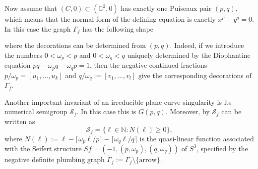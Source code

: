 \documentclass[oneside]{amsart}
\numberwithin{equation}{section}
\numberwithin{equation}{subsection}
\theoremstyle{plain}
\theoremstyle{definition}
\def\C{\mathbb C}
\newcommand{\w}{\omega}
\newcommand{\Se}{\mathcal{S}}
\begin{document}
Now assume that $(C,0)\subset(\C^2,0)$ has exactly one Puiseaux pair $(p,q)$, which means that the normal form of the defining equation is exactly 
$x^p+y^q=0$. In this case the graph $\Gamma_f$ has the following shape 
\begin{figure}[h!]
 \begin{center}
    \end{center}
\end{figure}
where the decorations can be determined from $(p,q)$. Indeed,  
if we introduce the numbers $0<\w_p<p$ and $0<\w_q<q$ uniquely
determined by  the Diophantine equation $pq-\w_p q-\w_q p=1$,  then the  negative continued 
fractions $p/\w_p=[u_1,\dots,u_k]$ and $q/\w_q:=[v_1,\dots,v_l]$ give
the corresponding decorations of $\Gamma_f$. 

Another important invariant of an irreducible plane curve singularity is its
numerical semigroup $\Se_f$. In this case this is $G(p,q)$. Moreover, by \cite{LSz_module} $\Se_f$ can be written as
\begin{equation}
    \label{eq:planesing_asN}
    \Se_f
=\{\ell\in\mathbb{N}: N(\ell)\ge 0\},
\end{equation}
where $N(\ell):=\ell-\lceil\w_p \ell/ p\rceil-\lceil\w_q \ell/q\rceil$ is the quasi-linear function associated with the Seifert structure $Sf=(-1, (p,\w_p),(q,\w_q))$ of $S^3$, specified by the negative definite plumbing graph $\widetilde{\Gamma}_f:=\Gamma_f\setminus\{\mbox{arrow}\}$. 
\end{document}
